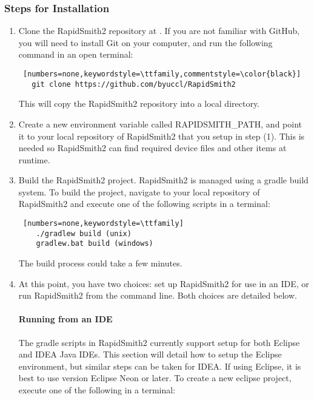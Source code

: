 \subsubsection{Steps for Installation}

\begin{enumerate}
  \item Clone the RapidSmith2 repository at
  {}. If you are not
  familiar with GitHub, you will need to install Git on your computer, and run the
  following command in an open terminal: 

\begin{lstlisting} [numbers=none,keywordstyle=\ttfamily,commentstyle=\color{black}] 
   git clone https://github.com/byuccl/RapidSmith2
\end{lstlisting}
 
  \noindent This will copy the RapidSmith2 repository into a local directory.
  \item Create a new environment variable called RAPIDSMITH\_PATH, and point it
  to your local repository of RapidSmith2 that you setup in step (1). This is needed so
  RapidSmith2 can find required device files and other items at runtime.
  \item Build the  RapidSmith2 project. RapidSmith2 is managed using a gradle build system.
  To build the project, navigate to your local repository of RapidSmith2 and execute one
  of the following scripts in a terminal:
  
\begin{lstlisting} [numbers=none,keywordstyle=\ttfamily]
	./gradlew build (unix)
	gradlew.bat build (windows)
\end{lstlisting}
  
  The build process could take a few minutes.
  \item At this point, you have two choices: set up RapidSmith2 for use in an IDE, or
  run RapidSmith2 from the command line. Both choices are detailed below.
  \paragraph{Running from an IDE} The gradle scripts in RapidSmith2 currently support
  setup for both Eclipse and IDEA Java IDEs. This section will detail how to
  setup the Eclipse environment, but similar steps can be taken for IDEA. If
  using Eclipse, it is best to use version Eclipse Neon or later. To create a
  new eclipse project, execute one of the following in a terminal:
  

\end{enumerate}

